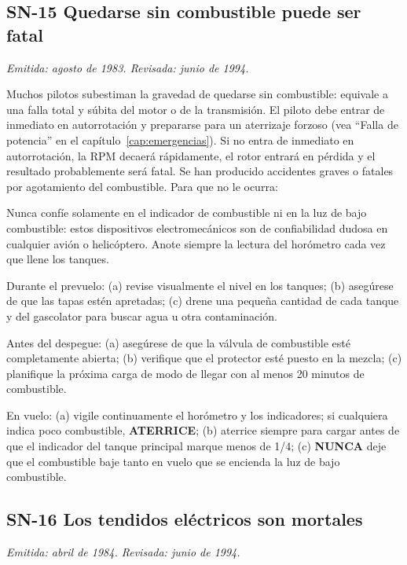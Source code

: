 \subsection*{SN-15 \quad Quedarse sin combustible puede ser fatal}
{\small\textit{Emitida: agosto de 1983. Revisada: junio de 1994.}}

Muchos pilotos subestiman la gravedad de quedarse sin combustible: equivale a una falla total y súbita del motor o de la transmisión. El piloto debe entrar de inmediato en autorrotación y prepararse para un aterrizaje forzoso (vea ``Falla de potencia'' en el capítulo~\ref{cap:emergencias}). Si no entra de inmediato en autorrotación, la RPM decaerá rápidamente, el rotor entrará en pérdida y el resultado probablemente será fatal. Se han producido accidentes graves o fatales por agotamiento del combustible. Para que no le ocurra:

\begin{pasos}
\item Nunca confíe solamente en el indicador de combustible ni en la luz de bajo combustible: estos dispositivos electromecánicos son de confiabilidad dudosa en cualquier avión o helicóptero. Anote siempre la lectura del horómetro cada vez que llene los tanques.
\item Durante el prevuelo: (a) revise visualmente el nivel en los tanques; (b) asegúrese de que las tapas estén apretadas; (c) drene una pequeña cantidad de cada tanque y del gascolator para buscar agua u otra contaminación.
\item Antes del despegue: (a) asegúrese de que la válvula de combustible esté completamente abierta; (b) verifique que el protector esté puesto en la mezcla; (c) planifique la próxima carga de modo de llegar con al menos 20 minutos de combustible.
\item En vuelo: (a) vigile continuamente el horómetro y los indicadores; si cualquiera indica poco combustible, \textbf{ATERRICE}; (b) aterrice siempre para cargar antes de que el indicador del tanque principal marque menos de 1/4; (c) \textbf{NUNCA} deje que el combustible baje tanto en vuelo que se encienda la luz de bajo combustible.
\end{pasos}

\subsection*{SN-16 \quad Los tendidos eléctricos son mortales}
{\small\textit{Emitida: abril de 1984. Revisada: junio de 1994.}}


